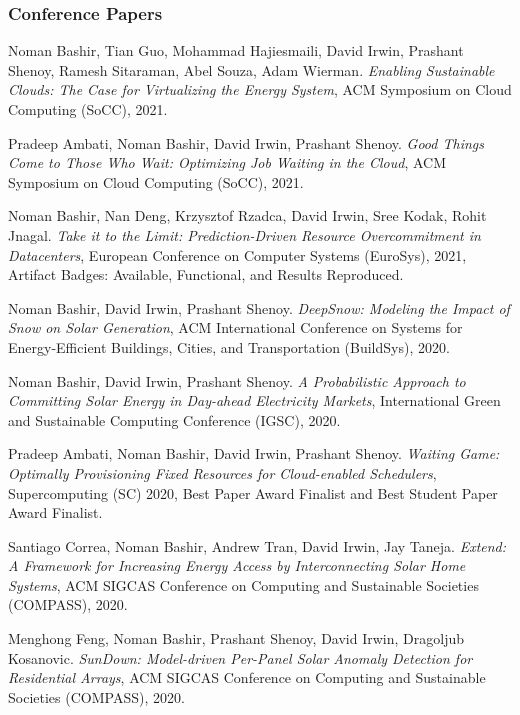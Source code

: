 \documentclass[11pt, a4paper, DIV=12]{scrartcl}
\begin{document}
\begin{thebibliography}{5}

\subsubsection*{Conference Papers}

	Noman Bashir, Tian Guo, Mohammad Hajiesmaili, David Irwin, Prashant Shenoy, Ramesh Sitaraman, Abel Souza, Adam Wierman.
	\emph{Enabling Sustainable Clouds: The Case for Virtualizing the Energy System}, 
	 ACM Symposium on Cloud Computing (SoCC), 2021. 
	


    Pradeep Ambati, Noman Bashir, David Irwin, Prashant Shenoy.
	\emph{Good Things Come to Those Who Wait: Optimizing Job Waiting in the Cloud},
	ACM Symposium on Cloud Computing (SoCC), 2021.	

	Noman Bashir, Nan Deng, Krzysztof Rzadca, David Irwin, Sree Kodak, Rohit Jnagal.
	\emph{Take it to the Limit: Prediction-Driven Resource Overcommitment in Datacenters},
    European Conference on Computer Systems (EuroSys), 2021, Artifact Badges: Available, Functional, and Results Reproduced.	

	Noman Bashir, David Irwin, Prashant Shenoy.
	\emph{DeepSnow: Modeling the Impact of Snow on Solar Generation},
	ACM International Conference on Systems for Energy-Efficient Buildings, Cities, and Transportation (BuildSys), 2020.

    Noman Bashir, David Irwin, Prashant Shenoy.
	\emph{A Probabilistic Approach to Committing Solar Energy in Day-ahead Electricity Markets},
	International Green and Sustainable Computing Conference (IGSC), 2020.

	Pradeep Ambati, Noman Bashir, David Irwin, Prashant Shenoy.
    \emph{Waiting Game: Optimally Provisioning Fixed Resources for Cloud-enabled Schedulers},
	Supercomputing (SC) 2020, Best Paper Award Finalist and Best Student Paper Award Finalist.
	
	Santiago Correa, Noman Bashir, Andrew Tran, David Irwin, Jay Taneja.
	\emph{Extend: A Framework for Increasing Energy Access by Interconnecting Solar Home Systems},
	ACM SIGCAS Conference on Computing and Sustainable Societies (COMPASS), 2020.
	
	Menghong Feng, Noman Bashir, Prashant Shenoy, David Irwin, Dragoljub Kosanovic.
	\newblock \emph{SunDown: Model-driven Per-Panel Solar Anomaly Detection for Residential Arrays},
	\newblock ACM SIGCAS Conference on Computing and Sustainable Societies (COMPASS), 2020.
	

\end{thebibliography}
\end{document}

